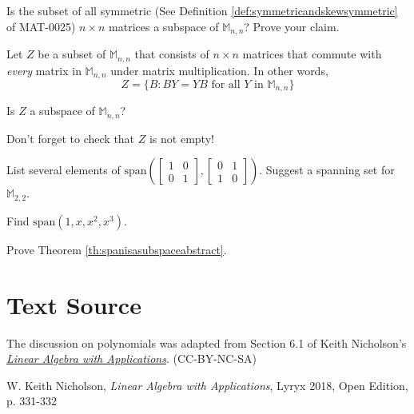 \documentclass{ximera}
\begin{document}
\begin{problem}\label{prob:symmetricsubspace}
Is the subset of all symmetric (See Definition \ref{def:symmetricandskewsymmetric} of MAT-0025) $n\times n$ matrices a subspace of $\mathbb{M}_{n,n}$?  Prove your claim. 
\end{problem}

\begin{problem}\label{prob:abstractvectspace8}
Let $Z$ be a subset of $\mathbb{M}_{n,n}$ that consists of $n\times n$ matrices that commute with {\it every} matrix in $\mathbb{M}_{n,n}$ under matrix multiplication. In other words,
$$Z=\{B : BY=YB \mbox{ for all } Y \mbox{ in } \mathbb{M}_{n,n}\}$$

Is $Z$ a subspace of $\mathbb{M}_{n,n}$?

\begin{hint}
Don't forget to check that $Z$ is not empty!
\end{hint}
\end{problem}

\begin{problem}\label{prob:abstractvectspace9}
List several elements of $\mbox{span}\left(\begin{bmatrix}1&0\\0&1\end{bmatrix}, \begin{bmatrix}0&1\\1&0\end{bmatrix}\right)$.  Suggest a spanning set for $\mathbb{M}_{2,2}$.
\end{problem}

\begin{problem}\label{prob:abstractvectspace10}
Find $\mbox{span}(1, x, x^2, x^3)$.
\end{problem}

\begin{problem}\label{prob:spanisasubspaceabstract}
Prove Theorem \ref{th:spanisasubspaceabstract}.
\end{problem}

\section*{Text Source} The discussion on polynomials was adapted from Section 6.1 of Keith Nicholson's \href{https://open.umn.edu/opentextbooks/textbooks/linear-algebra-with-applications}{\it Linear Algebra with Applications}. (CC-BY-NC-SA)

W. Keith Nicholson, {\it Linear Algebra with Applications}, Lyryx 2018, Open Edition, p. 331-332 
\end{document}
